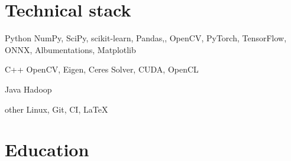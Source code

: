 \documentclass{tccv}
\begin{document}
\section{Technical stack}

\begin{factlist}

\item{Python}
     {NumPy, SciPy, scikit-learn, Pandas,, OpenCV, PyTorch, TensorFlow, ONNX, Albumentations, Matplotlib}

\item{C++}
     {OpenCV, Eigen, Ceres Solver, CUDA, OpenCL}

\item{Java}
     {Hadoop}

\item{other}
     {Linux, Git, CI, \LaTeX}

\end{factlist}

\vfill

\section{Education}
\end{document}
